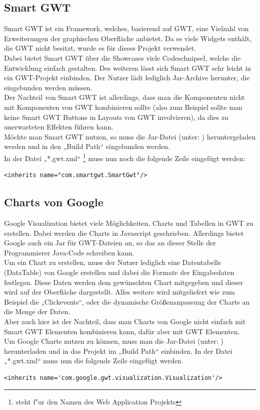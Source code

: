 \documentclass[12pt,a4paper,twoside]{article}
\begin{document}
\subsection{Smart GWT}
Smart GWT ist ein Framework, welches, basierend auf GWT, eine Vielzahl von Erweiterungen der graphischen Oberfläche anbietet. Da es viele Widgets enthält, die GWT nicht besitzt, wurde es für dieses Projekt verwendet.\\
Dabei bietet Smart GWT über die Showcases \cite{smartgwt} viele Codeschnipsel, welche die Entwicklung einfach gestalten. Des weiteren lässt sich Smart GWT sehr leicht in ein GWT-Projekt einbinden. Der Nutzer lädt lediglich Jar-Archive herunter, die eingebunden werden müssen. \\
Der Nachteil von Smart GWT ist allerdings, dass man die Komponenten nicht mit Komponenten von GWT kombinieren sollte (also zum Beispiel sollte man keine Smart GWT Buttons in Layouts von GWT involvieren), da dies zu unerwarteten Effekten führen kann.\\
\newline
Möchte man Smart GWT nutzen, so muss die Jar-Datei (unter: \cite{smartgwtdown}) heruntergeladen werden und in den „Build Path“ eingebunden werden.\\
In der Datei „*.gwt.xml“ \footnote{steht f"ur den Namen des Web Application Projekts} muss nun noch die folgende Zeile eingefügt werden:

\lstset{language=HTML}
\begin{lstlisting}
<inherits name="com.smartgwt.SmartGwt"/>
\end{lstlisting}

\subsection{Charts von Google}
Google Visualization bietet viele Möglichkeiten, Charts und Tabellen in GWT zu erstellen. Dabei werden die Charts in Javascript geschrieben. Allerdings bietet Google auch ein Jar für GWT-Dateien an, so das an dieser Stelle der Programmierer Java-Code schreiben kann. \\
Um ein Chart zu erstellen, muss der Nutzer lediglich eine Datentabelle (DataTable) von Google erstellen und dabei die Formate der Eingabedaten festlegen. Diese Daten werden dem gewünschten Chart mitgegeben und dieser wird auf der Oberfläche dargestellt. Alles weitere wird mitgeliefert wie zum Beispiel die „Clickevents“, oder die dynamische Größenanpassung der Charts an die Menge der Daten.\\
Aber auch hier ist der Nachteil, dass man Charts von Google nicht einfach mit Smart GWT Elementen kombinieren kann, dafür aber mit GWT Elementen.\\
\newline
Um Google Charts nutzen zu können, muss man die Jar-Datei (unter: \cite{charts}) herunterladen und in das Projekt im „Build Path“ einbinden. In der Datei „*.gwt.xml“ muss nun die folgende Zeile eingefügt werden.
\lstset{language=HTML}
\begin{lstlisting}
<inherits name='com.google.gwt.visualization.Visualization'/>
\end{lstlisting}
\end{document}

